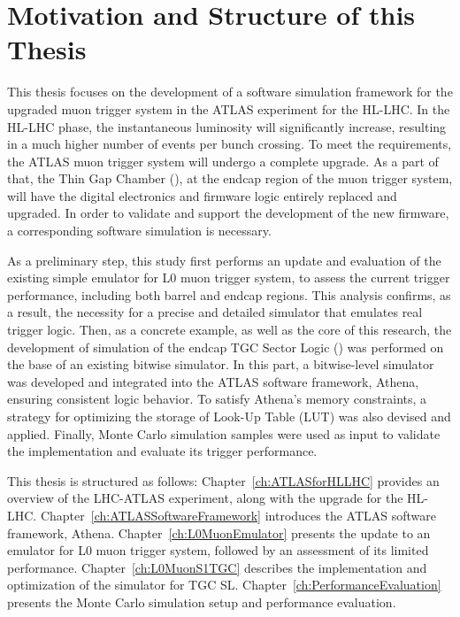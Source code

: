 \section{Motivation and Structure of this Thesis} \label{sec:motivation}
This thesis focuses on the development of a software simulation framework for the upgraded muon trigger system in the ATLAS experiment for the HL-LHC. In the HL-LHC phase, the instantaneous luminosity will significantly increase, resulting in a much higher number of events per bunch crossing. To meet the requirements, the ATLAS muon trigger system will undergo a complete upgrade. As a part of that, the Thin Gap Chamber (\TGC), at the endcap region of the muon trigger system, will have the digital electronics and firmware logic entirely replaced and upgraded. In order to validate and support the development of the new firmware, a corresponding software simulation is necessary. 

As a preliminary step, this study first performs an update and evaluation of the existing simple emulator for L0 muon trigger system, to assess the current trigger performance, including both barrel and endcap regions. This analysis confirms, as a result, the necessity for a precise and detailed simulator that emulates real trigger logic. Then, as a concrete example, as well as the core of this research, the development of simulation of the endcap TGC Sector Logic (\SL) was performed on the base of an existing bitwise simulator. In this part, a bitwise-level simulator was developed and integrated into the ATLAS software framework, Athena, ensuring consistent logic behavior. To satisfy Athena’s memory constraints, a strategy for optimizing the storage of Look-Up Table (LUT) was also devised and applied. Finally, Monte Carlo simulation samples were used as input to validate the implementation and evaluate its trigger performance.

This thesis is structured as follows: Chapter~\ref{ch:ATLASforHLLHC} provides an overview of the LHC-ATLAS experiment, along with the upgrade for the HL-LHC. Chapter~\ref{ch:ATLASSoftwareFramework} introduces the ATLAS software framework, Athena. Chapter~\ref{ch:L0MuonEmulator} presents the update to an emulator for L0 muon trigger system, followed by an assessment of its limited performance. Chapter~\ref{ch:L0MuonS1TGC} describes the implementation and optimization of the simulator for TGC SL. Chapter~\ref{ch:PerformanceEvaluation} presents the Monte Carlo simulation setup and performance evaluation.